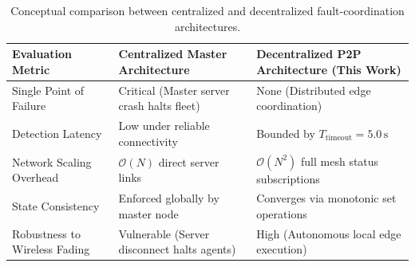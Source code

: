 \begin{table}[htbp]
\centering
\small
\setlength{\tabcolsep}{6pt}
\caption{Conceptual comparison between centralized and decentralized fault-coordination architectures.}
\label{tab:centralized_vs_decentralized_fault}
\begin{tabularx}{\textwidth}{@{}l L L@{}}
\toprule
\textbf{Evaluation Metric} & \textbf{Centralized Master Architecture} & \textbf{Decentralized P2P Architecture (This Work)} \\ \midrule
Single Point of Failure & Critical (Master server crash halts fleet) & None (Distributed edge coordination) \\ \addlinespace
Detection Latency & Low under reliable connectivity & Bounded by $T_{\text{timeout}} = 5.0\,\text{s}$ \\ \addlinespace
Network Scaling Overhead & $\mathcal{O}(N)$ direct server links & $\mathcal{O}(N^2)$ full mesh status subscriptions \\ \addlinespace
State Consistency & Enforced globally by master node & Converges via monotonic set operations \\ \addlinespace
Robustness to Wireless Fading & Vulnerable (Server disconnect halts agents) & High (Autonomous local edge execution) \\ \bottomrule
\end{tabularx}
\end{table}

